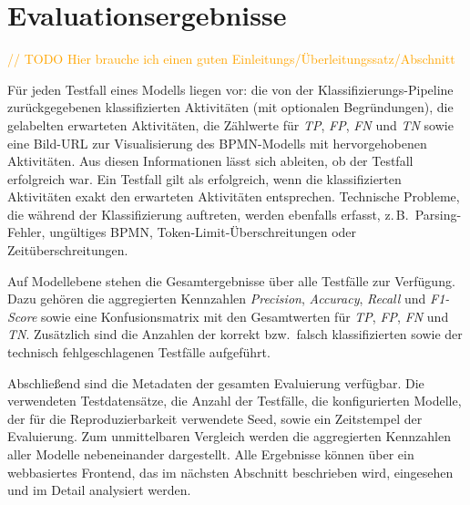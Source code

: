 \section{Evaluationsergebnisse}\label{sec:generierte-resultate}

\textcolor{orange}{// TODO Hier brauche ich einen guten Einleitungs/Überleitungssatz/Abschnitt}

Für jeden Testfall eines Modells liegen vor: die von der Klassifizierungs-Pipeline zurückgegebenen klassifizierten Aktivitäten (mit optionalen Begründungen), die gelabelten erwarteten Aktivitäten, die Zählwerte für \emph{\ac{TP}}, \emph{\ac{FP}}, \emph{\ac{FN}} und \emph{\ac{TN}} sowie eine Bild-URL zur Visualisierung des \ac{BPMN}-Modells mit hervorgehobenen Aktivitäten. Aus diesen Informationen lässt sich ableiten, ob der Testfall erfolgreich war. Ein Testfall gilt als erfolgreich, wenn die klassifizierten Aktivitäten exakt den erwarteten Aktivitäten entsprechen. Technische Probleme, die während der Klassifizierung auftreten, werden ebenfalls erfasst, z.\,B.\ Parsing-Fehler, ungültiges \ac{BPMN}, Token-Limit-Überschreitungen oder Zeitüberschreitungen.

Auf Modellebene stehen die Gesamtergebnisse über alle Testfälle zur Verfügung. Dazu gehören die aggregierten Kennzahlen \emph{Precision}, \emph{Accuracy}, \emph{Recall} und \emph{F1-Score} sowie eine Konfusionsmatrix mit den Gesamtwerten für \emph{\ac{TP}}, \emph{\ac{FP}}, \emph{\ac{FN}} und \emph{\ac{TN}}. Zusätzlich sind die Anzahlen der korrekt bzw.\ falsch klassifizierten sowie der technisch fehlgeschlagenen Testfälle aufgeführt.

Abschließend sind die Metadaten der gesamten Evaluierung verfügbar. Die verwendeten Testdatensätze, die Anzahl der Testfälle, die konfigurierten Modelle, der für die Reproduzierbarkeit verwendete Seed, sowie ein Zeitstempel der Evaluierung. Zum unmittelbaren Vergleich werden die aggregierten Kennzahlen aller Modelle nebeneinander dargestellt. Alle Ergebnisse können über ein webbasiertes Frontend, das im nächsten Abschnitt beschrieben wird, eingesehen und im Detail analysiert werden.
